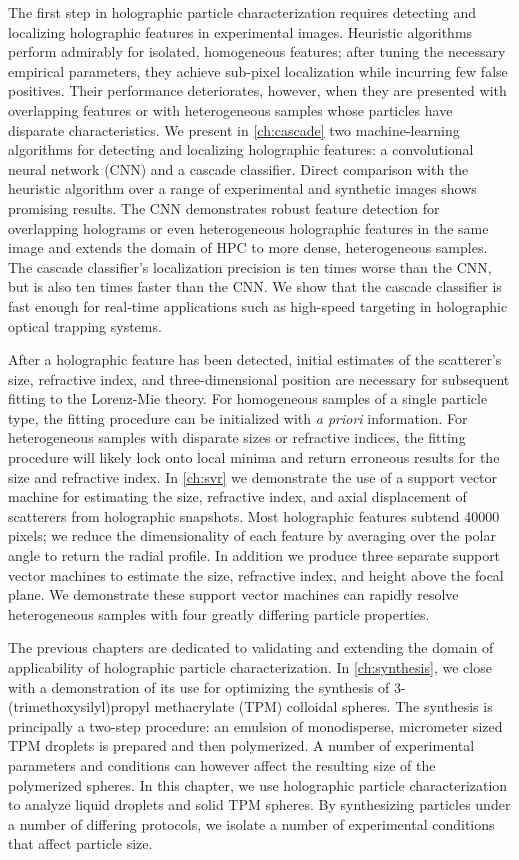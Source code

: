 The first step in holographic particle characterization
requires detecting and localizing holographic features in experimental
images. Heuristic algorithms perform admirably for isolated, homogeneous
features; after tuning the necessary empirical parameters, they achieve
sub-pixel localization while incurring few false positives. Their
performance deteriorates, however, when they are presented with overlapping
features or with heterogeneous samples whose particles have disparate
characteristics. We present in \autoref{ch:cascade} two machine-learning
algorithms for detecting and localizing holographic features: a convolutional
neural network (CNN) and a cascade classifier. Direct comparison with the
heuristic algorithm over a range of experimental and synthetic images
shows promising results. The CNN demonstrates robust feature detection
for overlapping holograms or even heterogeneous holographic features
in the same image and extends the domain of HPC to more dense, heterogeneous
samples. The cascade classifier's localization precision
is ten times worse than the CNN, but is also ten times faster than
the CNN. We show that the cascade classifier is fast enough for real-time
applications such as high-speed targeting in holographic optical
trapping systems.

After a holographic feature has been detected, initial estimates of the
scatterer's size, refractive index, and three-dimensional position
are necessary for subsequent fitting to the Lorenz-Mie theory.
For homogeneous samples of a single particle type, the fitting procedure
can be initialized with \emph{a priori} information. For heterogeneous samples
with disparate sizes or refractive indices, the fitting procedure
will likely lock onto local minima and return erroneous results for
the size and refractive index.
In \autoref{ch:svr} we demonstrate the use of a support vector machine for
estimating the size, refractive index, and axial displacement of scatterers
from holographic snapshots. Most holographic features subtend \SI{40000}{} pixels;
we reduce the dimensionality of each feature by averaging over the polar
angle to return the radial profile. In addition we produce three separate support vector machines to
estimate the size, refractive index, and height above the focal plane.
We demonstrate these support vector machines can rapidly resolve heterogeneous
samples with four greatly differing particle properties.

The previous chapters are dedicated to validating and extending
the domain of applicability of holographic particle characterization.
In \autoref{ch:synthesis}, we close with a demonstration of its use for
optimizing the synthesis of 3-(trimethoxysilyl)propyl methacrylate (TPM)
colloidal spheres. The synthesis is principally a two-step procedure:
an emulsion of monodisperse, micrometer sized TPM droplets is prepared
and then polymerized. A number of experimental parameters and conditions
can however affect the resulting size of the polymerized spheres. In this
chapter, we use holographic particle characterization to analyze
liquid droplets and solid TPM spheres. By synthesizing particles under a
number of differing protocols, we isolate a number of experimental conditions
that affect particle size.
